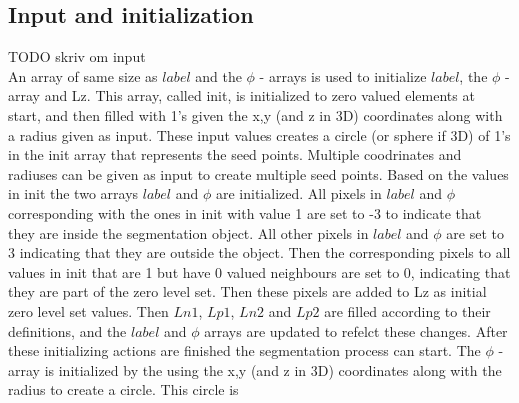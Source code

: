 \subsection{Input and initialization}
TODO skriv om input\\
An array of same size as $label$ and the $\phi$ - arrays is used to initialize $label$, the $\phi$ - array and Lz. This array, called init, is initialized to zero valued elements at start, and then filled with 1's given the x,y (and z in 3D) coordinates along with a radius given as input. These input values creates a circle (or sphere if 3D) of 1's in the init array that represents the seed points. Multiple coodrinates and radiuses can be given as input to create multiple seed points. Based on the values in init the two arrays $label$ and $\phi$ are initialized. All pixels in $label$ and $\phi$ corresponding with the ones in init with value 1 are set to -3 to indicate that they are inside the segmentation object. All other pixels in $label$ and $\phi$ are set to 3 indicating that they are outside the object. Then the corresponding pixels to all values in init that are 1 but have 0 valued neighbours are set to 0, indicating that they are part of the zero level set. Then these pixels are added to Lz as initial zero level set values. Then $Ln1$, $Lp1$, $Ln2$ and $Lp2$ are filled according to their definitions, and the $label$ and $\phi$ arrays are updated to refelct these changes. After these initializing actions are finished the segmentation process can start. 
The $\phi$ - array is initialized by the using the x,y (and z in 3D) coordinates along with the radius to create a circle. This circle is 

